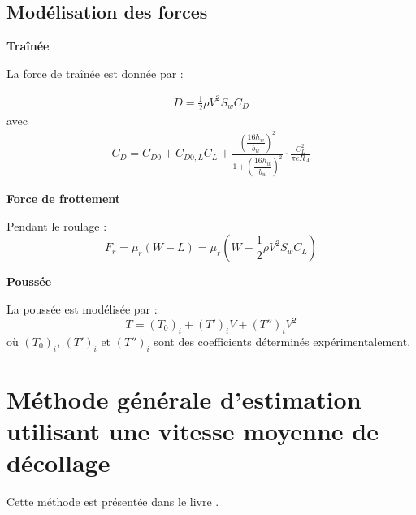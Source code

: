 			\vspace{1cm}
		
		\subsection{Modélisation des forces}
		
			\textbf{Traînée}
			
				La force de traînée est donnée par :
				
				\begin{align}
					D=\frac{1}{2}\rho V^2 S_w C_D
				\end{align}
				avec
				\begin{align}
					C_D= C_{D0}	+	C_{D0,L}C_L +
					\frac{	\left(\dfrac{16h_w}{b_w}\right)^2  }{ 1+\left(\dfrac{16h_w}{b_w}\right)^2 }	\cdot \frac{C_L^2}{\pi e R_A}
				\end{align}
				
			
			\vspace{0.5cm}
			
			\textbf{Force de frottement}
			
				Pendant le roulage :
				\begin{equation}
					F_r= \mu_r(W-L)	= \mu_r	\left( 	W-\frac{1}{2}\rho V^2 S_w C_L  \right)
				\end{equation}
			
			\vspace{0.5cm}
			
			\textbf{Poussée}
			
				La poussée est modélisée par :
				\begin{equation}
					T=(T_0)_i+(T')_iV+(T'')_iV^2
				\end{equation}
				où $(T_0)_i$, $(T')_i$ et $(T'')_i$ sont des coefficients déterminés expérimentalement.
		
	



%
		\section{ Méthode générale d’estimation utilisant une vitesse moyenne de décollage } 
		Cette méthode est présentée dans le livre \cite{smi:60}.
		
